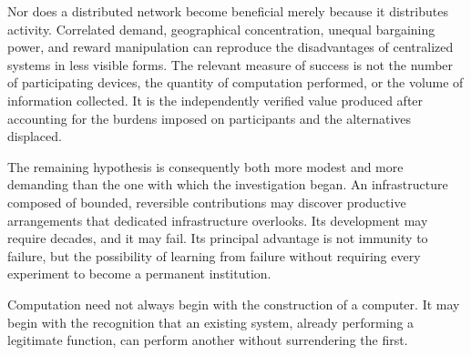 Nor does a distributed network become beneficial merely because it distributes activity. Correlated demand, geographical concentration, unequal bargaining power, and reward manipulation can reproduce the disadvantages of centralized systems in less visible forms. The relevant measure of success is not the number of participating devices, the quantity of computation performed, or the volume of information collected. It is the independently verified value produced after accounting for the burdens imposed on participants and the alternatives displaced.

The remaining hypothesis is consequently both more modest and more demanding than the one with which the investigation began. An infrastructure composed of bounded, reversible contributions may discover productive arrangements that dedicated infrastructure overlooks. Its development may require decades, and it may fail. Its principal advantage is not immunity to failure, but the possibility of learning from failure without requiring every experiment to become a permanent institution.

Computation need not always begin with the construction of a computer. It may begin with the recognition that an existing system, already performing a legitimate function, can perform another without surrendering the first.
